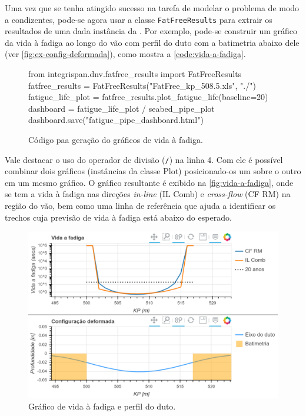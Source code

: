 Uma vez que se tenha atingido sucesso na tarefa de modelar o problema de modo a condizentes, pode-se agora usar a classe \texttt{FatFreeResults} para extrair os resultados de uma dada instância da \fatfree. Por exemplo, pode-se construir um gráfico da vida à fadiga ao longo do vão com perfil do duto com a batimetria abaixo dele (ver \autoref{fig:ex-config-deformada}), como mostra a \autoref{code:vida-a-fadiga}.

\begin{figure}[!ht] %
	\caption{Código paa geração do gráficos de vida à fadiga.}\label{code:vida-a-fadiga}
	\begin{pythoncode}
from integrispan.dnv.fatfree_results import FatFreeResults
fatfree_results = FatFreeResults("FatFree_kp_508.5.xls", "./")
fatigue_life_plot = fatfree_results.plot_fatigue_life(baseline=20)
dashboard = fatigue_life_plot / seabed_pipe_plot
dashboard.save("fatigue_pipe_dashboard.html")
	\end{pythoncode}
\end{figure}

Vale destacar o uso do operador de divisão (\texttt{/}) na linha 4. Com ele é possível combinar dois gráficos (instâncias da classe Plot) posicionado-os um sobre o outro em um mesmo gráfico. O gráfico resultante é exibido na \autoref{fig:vida-a-fadiga}, onde se tem a vida à fadiga nas direções \textit{in-line} (IL Comb) e \textit{cross-flow} (CF RM) na região do vão, bem como uma linha de referência que ajuda a identificar os trechos cuja previsão de vida à fadiga está abaixo do esperado.

\begin{figure}[!ht]
	\centering
	\caption{Gráfico de vida à fadiga e perfil do duto.}\label{fig:vida-a-fadiga}
	\includegraphics[width=\textwidth]{imagens/exemplo/vida-a-fadiga}
\end{figure}
